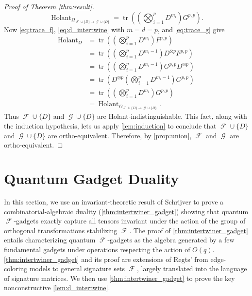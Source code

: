 \documentclass{theoretics}
\DeclareMathOperator{\tr}{tr}
\DeclareMathOperator{\fc}{\mathcal{F}}
\DeclareMathOperator{\gc}{\mathcal{G}}
\DeclareMathOperator{\holant}{Holant}
\begin{document}
\begin{proof}[Proof of Theorem \ref{thm:result}]
\begin{equation}
        \holant_{\Omega_{\fc\cup\{D\}\to\gc\cup\{D\}}}
        = \tr\left(\left(\bigotimes_{i=1}^p D^{m_i}\right) G^{p,p}\right).
    \end{equation}
    Now \eqref{eq:trace_f}, \eqref{eq:d_intertwine} with $m=d=p$, and \eqref{eq:trace_g} 
    give
    \begin{align*}
        \holant_{\Omega}
        &= \tr\left(\left(\bigotimes_{i=1}^p D^{m_i}\right) F^{p,p}\right) \\
        &= \tr\left(\left(\bigotimes_{i=1}^p D^{m_i-1}\right) D^{\otimes p}  F^{p,p}\right) \\
        &= \tr\left(\left(\bigotimes_{i=1}^p D^{m_i-1}\right) G^{p,p} D^{\otimes p}\right) \\
        &= \tr\left(D^{\otimes p}\left(\bigotimes_{i=1}^p D^{m_i-1}\right) G^{p,p} \right) \\
        &= \tr\left(\left(\bigotimes_{i=1}^p D^{m_i}\right) G^{p,p} \right) \\
        &= \holant_{\Omega_{\fc\cup\{D\}\to\gc\cup\{D\}}}.
    \end{align*}
    Thus $\fc \cup \{D\}$ and $\gc \cup \{D\}$ are Holant-indistinguishable. This fact, along with the
    induction hypothesis, lets us apply \autoref{lem:induction} to conclude that $\fc \cup \{D\}$
    and $\gc \cup \{D\}$ are ortho-equivalent. Therefore, by \autoref{prop:union}, $\fc$ and $\gc$
    are ortho-equivalent.
\end{proof} 

\section{Quantum Gadget Duality}
\label{sec:duality}
In this section, we use an invariant-theoretic
result of Schrijver \cite{schrijver_tensor_2008} to prove a
combinatorial-algebraic duality (\autoref{thm:intertwiner_gadget}) showing that
quantum $\fc$-gadgets exactly capture all tensors invariant under the
action of the group of orthogonal transformations stabilizing $\fc$.
The proof of \autoref{thm:intertwiner_gadget} entails characterizing quantum $\fc$-gadgets as 
the algebra generated by a few fundamental gadgets under operations respecting the action 
of $O(q)$. 
\autoref{thm:intertwiner_gadget} and its proof are extensions of Regts' 
\cite[Theorem 3]{regts_rank_2012}
from edge-coloring models to general signature sets $\fc$, largely translated into the language of
signature matrices. We then use \autoref{thm:intertwiner_gadget} to prove the key 
nonconstructive \autoref{lem:d_intertwine}.
\end{document}
